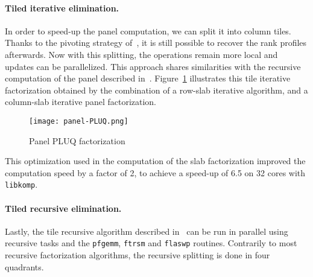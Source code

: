 \documentclass{article}
\newcommand{\pfgemm}{\texttt{pfgemm}\xspace}
\newcommand{\pftrsm}{\texttt{ftrsm}\xspace}
\newcommand{\pflaswp}{\texttt{flaswp}\xspace}
\newcommand{\libkomp}{\texttt{libkomp}\xspace}
\begin{document}
 

 
 
 
 
 
 
 



 
 
 
 
 
 
 
 

 
 
\vspace{-1em}
\paragraph{Tiled iterative elimination.}
In order to speed-up the panel computation, we can split it into column
tiles. Thanks to the pivoting strategy of~\cite{DPS13}, it is still possible to
recover the rank profiles afterwards. Now with this splitting, the operations
remain more local and updates can be parallelized.
This approach shares similarities with the recursive computation of the panel
described in~\cite{DFLL11}.
Figure~\ref{fig:panel-pluq} illustrates this tile iterative factorization
obtained by the combination of a row-slab iterative algorithm, and a column-slab
iterative panel factorization.
 
 
 
 

 
 
 
 
 
 
 
 
\begin{figure}[ht!]
\centering
\texttt{[image: panel-PLUQ.png]}
\caption{Panel PLUQ factorization}
\label{fig:panel-pluq}
\end{figure}
 
 
 

This optimization used in the computation of the slab factorization
improved the computation speed by a factor of 2, to achieve a speed-up
of 6.5 on 32 cores with \libkomp.  

\vspace{-1em}
\paragraph{Tiled recursive elimination.}
Lastly, the tile recursive algorithm described in~\cite{DPS13} can be run in
parallel using recursive tasks and the \pfgemm, \pftrsm and \pflaswp routines.
Contrarily to most recursive factorization algorithms, the recursive splitting
is done in four quadrants.
 
\end{document}

